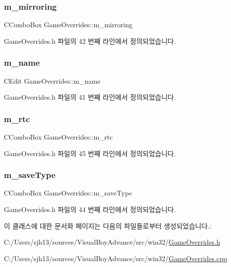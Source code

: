 \subsubsection{\texorpdfstring{m\+\_\+mirroring}{m\_mirroring}}
{\footnotesize\ttfamily C\+Combo\+Box Game\+Overrides\+::m\+\_\+mirroring}



Game\+Overrides.\+h 파일의 42 번째 라인에서 정의되었습니다.

\mbox{\label{class_game_overrides_a5726c0df72b2d2f43ee641026409f026}} 
\subsubsection{\texorpdfstring{m\+\_\+name}{m\_name}}
{\footnotesize\ttfamily C\+Edit Game\+Overrides\+::m\+\_\+name}



Game\+Overrides.\+h 파일의 41 번째 라인에서 정의되었습니다.

\mbox{\label{class_game_overrides_a68ff1f6bae098f28c5f7a30b90141781}} 
\subsubsection{\texorpdfstring{m\+\_\+rtc}{m\_rtc}}
{\footnotesize\ttfamily C\+Combo\+Box Game\+Overrides\+::m\+\_\+rtc}



Game\+Overrides.\+h 파일의 45 번째 라인에서 정의되었습니다.

\mbox{\label{class_game_overrides_ac56384b1ec6d9198db961d3d88e5bbc7}} 
\subsubsection{\texorpdfstring{m\+\_\+save\+Type}{m\_saveType}}
{\footnotesize\ttfamily C\+Combo\+Box Game\+Overrides\+::m\+\_\+save\+Type}



Game\+Overrides.\+h 파일의 44 번째 라인에서 정의되었습니다.



이 클래스에 대한 문서화 페이지는 다음의 파일들로부터 생성되었습니다.\+:\begin{DoxyCompactItemize}
\item 
C\+:/\+Users/sjh13/sources/\+Visual\+Boy\+Advance/src/win32/\mbox{\hyperlink{_game_overrides_8h}{Game\+Overrides.\+h}}\item 
C\+:/\+Users/sjh13/sources/\+Visual\+Boy\+Advance/src/win32/\mbox{\hyperlink{_game_overrides_8cpp}{Game\+Overrides.\+cpp}}\end{DoxyCompactItemize}
